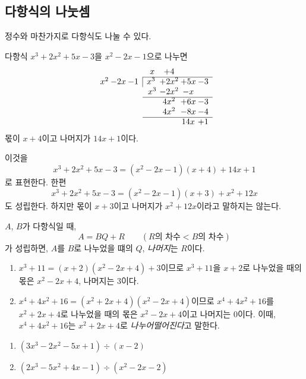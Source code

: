\documentclass{oblivoir}
\begin{document}
\clearpage
\subsection{다항식의 나눗셈}

정수와 마찬가지로 다항식도 나눌 수 있다.

%
\exam{}
다항식 \(x^3+2x^2+5x-3\)을 \(x^2-2x-1\)으로 나누면
\begin{equation*}
\begin{array}{c@{\:}c@{\:}cc@{\:}c@{\:}c@{\:}c}
&&&x&+4\\
\cline{4-7}
x^2&-2x&-1	&\multicolumn{1}{|c}{x^3}&+2x^2&+5x&-3\\
&&							&x^3	&-2x^2	&-x\\
\cline{4-7}
&&							&			&4x^2	&+6x		&-3\\
&&							&			&4x^2	&-8x	&-4\\
\cline{4-7}
&&							&			&			&14x	&+1
\end{array}
\end{equation*}
몫이 \(x+4\)이고 나머지가 \(14x+1\)이다.

이것을
\[x^3+2x^2+5x-3=(x^2-2x-1)(x+4)+14x+1\]
로 표현한다.
한편
\[x^3+2x^2+5x-3=(x^2-2x-1)(x+3)+x^2+12x\]
도 성립한다.
하지만 몫이 \(x+3\)이고 나머지가 \(x^2+12x\)이라고 말하지는 않는다.

\begin{mdframed}
%
\(A\), \(B\)가 다항식일 때,
\[A=BQ+R\qquad(R\text{의 차수}<B\text{의 차수})\]
가 성립하면, \(A\)를 \(B\)로 나누었을 떄의  \(Q\), \emph{나머지}는 \(R\)이다.
\end{mdframed}

\clearpage
%
\exam{}
\begin{enumerate}
\item
\(x^3+11=(x+2)(x^2-2x+4)+3\)이므로 \(x^3+11\)을 \(x+2\)로 나누었을 때의 몫은 \(x^2-2x+4\), 나머지는 \(3\)이다.
\item
\(x^4+4x^2+16=(x^2+2x+4)(x^2-2x+4)\)이므로 \(x^4+4x^2+16\)를 \(x^2+2x+4\)로 나누었을 때의 몫은 \(x^2-2x+4\)이고 나머지는 \(0\)이다.
이때, \(x^4+4x^2+16\)는 \(x^2+2x+4\)로 \emph{나누어떨어진다}고 말한다.
\end{enumerate}

%
\begin{enumerate}\label{div2}
\item
\((3x^3-2x^2-5x+1)\div(x-2)\)
\item
\((2x^3-5x^2+4x-1)\div(x^2-2x-2)\)
\end{enumerate}
\end{document}
